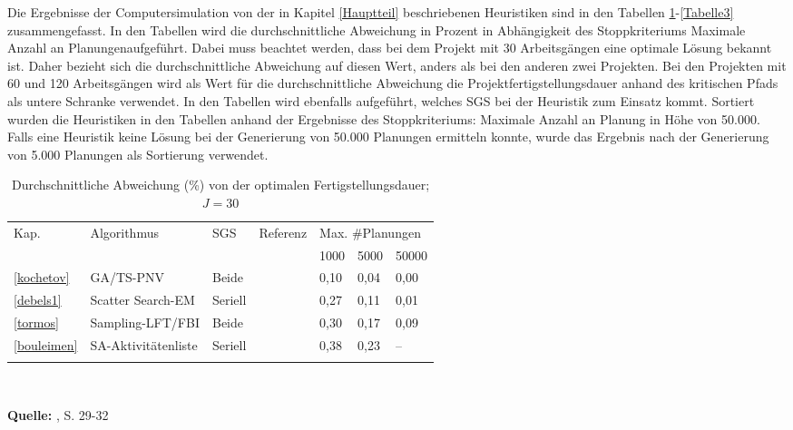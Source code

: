 \documentclass[a4paper,12pt,normalheadings,footexclude,headinclude,liststotoc,nochapterprefix,onecolumn,oneside,parskip,pointlessnumbers]{scrreprt}
\begin{document}
Die Ergebnisse der Computersimulation von \cite{kolisch2006experimental} der in Kapitel \ref{Hauptteil} beschriebenen Heuristiken sind in den Tabellen \ref{Tabelle1}-\ref{Tabelle3} zusammengefasst. In den Tabellen wird die durchschnittliche Abweichung in Prozent in Abhängigkeit des Stoppkriteriums \glqq  Maximale Anzahl an Planungen\grqq\;aufgeführt. Dabei muss beachtet werden, dass bei dem Projekt mit 30 Arbeitsgängen eine optimale Lösung bekannt ist. Daher bezieht sich die durchschnittliche Abweichung auf diesen Wert, anders als bei den anderen zwei Projekten. Bei den Projekten mit 60 und 120 Arbeitsgängen wird als Wert für die durchschnittliche Abweichung die Projektfertigstellungsdauer anhand des kritischen Pfads als untere Schranke verwendet. In den Tabellen wird ebenfalls aufgeführt, welches SGS bei der Heuristik zum Einsatz kommt. Sortiert wurden die Heuristiken in den Tabellen anhand der Ergebnisse des Stoppkriteriums: Maximale Anzahl an Planung in Höhe von 50.000. Falls eine Heuristik keine Lösung bei der Generierung von 50.000 Planungen ermitteln konnte, wurde das Ergebnis nach der Generierung von 5.000 Planungen als Sortierung verwendet. %
\begin{table}[h!]
  \begin{center}
    \caption{Durchschnittliche Abweichung (\%) von der optimalen Fertigstellungsdauer; $J=30$}  
    \begin{small} 
    \label{Tabelle1}
    \vspace*{3mm}
    \begin{tabular}{lllllll}   %
Kap.  &     Algorithmus					& SGS		& Referenz	& \multicolumn{3}{l}{Max. \#Planungen}\\ 
           &						&                	&           		& 1000	& 5000 & 50000	   \\ \hline
\ref{kochetov} &	GA/TS-PNV & Beide                &      \citeauthor{kochetov2003evolutionary}     	& 0,10	& 0,04 & 0,00	   \\
\ref{debels1}&	Scatter Search-EM & Seriell                &      \citeauthor{debels2006hybrid}     	& 0,27	& 0,11 & 0,01	   \\
\ref{tormos}&		Sampling-LFT/FBI & Beide                &      \citeauthor{tormos2003efficient}     	& 0,30	& 0,17 & 0,09	   \\
\ref{bouleimen}&			SA-Aktivitätenliste & Seriell                &      \citeauthor{bouleimen2003new}     	& 0,38	& 0,23 & --	   \\
			\\ 
    \end{tabular} \\[3mm]
  \end{small} 
    {\footnotesize \textbf{Quelle:} \cite{kolisch2006experimental}, S. 29-32}   
  \end{center}
\end{table}
\end{document}

